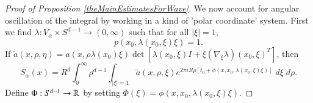 \begin{proof}[Proof of Proposition \ref{theMainEstimatesForWave}]
We now account for angular oscillation of the integral by working in a kind of 'polar coordinate' system. First we find $\lambda: V_\alpha \times S^{d-1} \to (0,\infty)$ such that for all $|\xi| = 1$,
%
\begin{equation}
    p(x_0, \lambda(x_0,\xi) \xi) = 1.
\end{equation}
%
If $\tilde{a}(x,\rho, \eta) = a(x, \rho \lambda(x_0) \xi ) \det [ \lambda(x_0,\xi) I + \xi (\nabla_\xi \lambda)(x_0,\xi)^T ]$, then
%
%
\begin{equation}
    S\!_\alpha(x) = R^d \int_0^\infty \rho^{d-1} \int_{|\xi| = 1} \tilde{a}(x,\rho, \xi) e^{2 \pi i R \rho [ t_0 + \phi(x, x_0, \lambda(x_0,\xi) \xi) ]}\; d\xi\; d\rho.
\end{equation}
%
Define $\Phi: S^{d-1} \to \operatorname{\mathbb{R}}$ by setting $\Phi(\xi) = \phi(x,x_0, \lambda(x_0,\xi) \xi)$.    
%
%
%
%
%
%
%
%
%
%
%
%
%
%
%
%                

\end{proof}
